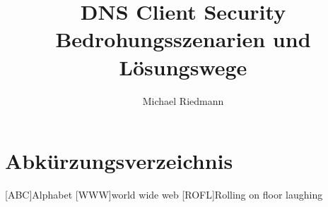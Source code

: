 \documentclass[Bachelor, BIC, german]{twbook}
\title{DNS Client Security\\Bedrohungsszenarien und Lösungswege}
\author{Michael Riedmann}
\begin{document}
\maketitle

\listoftodos



















 

\clearpage

\listoffigures
\clearpage

\listoftables
\clearpage

\lstlistoflistings
\clearpage

{}
\chapter*{Abkürzungsverzeichnis}
\begin{acronym}[XXXXX]
    [ABC]{Alphabet}
    [WWW]{world wide web}
    [ROFL]{Rolling on floor laughing}
\end{acronym}


\end{document}
